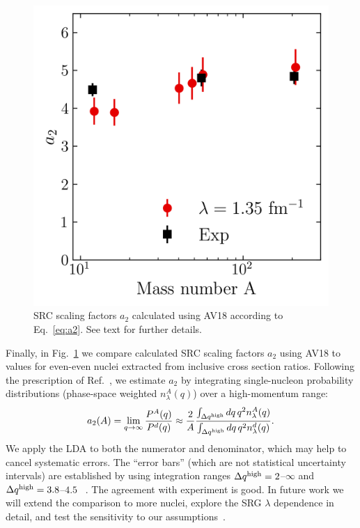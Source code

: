 \documentclass[10pt,aps,prc,floatfix,twocolumn,nofootinbib]{revtex4-1}
\begin{document}
\begin{figure}[tbh]
    \centering
\includegraphics[width=0.82\columnwidth]{figures_low_res/a2_errorbars_C12_O16_Ca40_Ca48_Fe56_Pb208_channels_1S0_3S1_kvnn_6_lamb_1p35.png}
    \caption{SRC scaling factors $a_2$ calculated using AV18 according to Eq.~\eqref{eq:a2}. See text for further details.}
    \label{fig:src_scaling_factors_a2}
\end{figure}

Finally, in Fig.~\ref{fig:src_scaling_factors_a2} we compare calculated SRC scaling factors $a_2$ using AV18 to values for even-even nuclei extracted from inclusive cross section ratios.
Following the prescription of Ref.~\cite{Ryckebusch:2019oya}, we estimate $a_2$ by integrating single-nucleon probability distributions (phase-space weighted $n_{\lambda}^A(q)$) over a high-momentum range:
%
\begin{align}
    \label{eq:a2}
    a_2(A) = \lim_{q\to\infty} \frac{P^A(q)}{P^d(q)} \approx \frac{2}{A} \frac{\int_{\Delta q^{\rm high}} dq\, q^2 n_{\lambda}^A(q)}{\int_{\Delta q^{\rm high}} dq\, q^2 n_{\lambda}^d(q)}.
\end{align}
%
We apply the LDA to both the numerator and denominator, which may help to cancel systematic errors.
The ``error bars'' (which are not statistical uncertainty intervals) are established by using integration ranges $\Delta q^{\rm high} = 2$--$\infty$ \fmi and  $\Delta q^{\rm high} = 3.8$--$4.5$ \fmi~\cite{Ryckebusch:2019oya}.
The agreement with experiment is good.
In future work we will extend the comparison to more nuclei, explore the SRG $\lambda$ dependence in detail, and test the sensitivity to our assumptions~\cite{Tropiano:2021prep}. 
\end{document}
